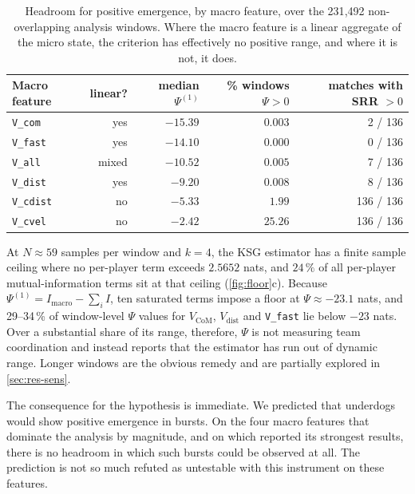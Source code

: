 \documentclass[11pt,a4paper]{article}
\newcommand{\code}[1]{\texttt{\small #1}}
\newcommand{\Vcom}{V_{\mathrm{CoM}}}
\newcommand{\Vdist}{V_{\mathrm{dist}}}
\begin{document}
\begin{table}[H]
\centering
\small
\begin{tabular}{@{}lrrrr@{}}
\toprule
\textbf{Macro feature} & \textbf{linear?} & \textbf{median $\Psi^{(1)}$} & \textbf{\% windows $\Psi>0$} & \textbf{matches with SRR $>0$} \\
\midrule
\code{V\_com}   & yes & $-15.39$ & $0.003$  & 2 / 136 \\
\code{V\_fast}  & yes & $-14.10$ & $0.000$  & 0 / 136 \\
\code{V\_all}   & mixed & $-10.52$ & $0.005$ & 7 / 136 \\
\code{V\_dist}  & yes & $-9.20$  & $0.008$  & 8 / 136 \\
\code{V\_cdist} & no & $-5.33$  & $1.99$ & 136 / 136 \\
\code{V\_cvel}  & no & $-2.42$  & $25.26$ & 136 / 136 \\
\bottomrule
\end{tabular}
\caption{Headroom for positive emergence, by macro feature, over the 231{,}492
non-overlapping analysis windows. Where the macro feature is a linear aggregate of the
micro state, the criterion has effectively no positive range, and where it is not, it does.}
\label{tab:headroom}
\end{table}

At $N\approx59$ samples per window and $k=4$, the KSG estimator has a finite sample ceiling where no per-player
term exceeds $2.5652$ nats, and $24\,\%$ of all per-player mutual-information terms
sit at that ceiling (\cref{fig:floor}c). Because $\Psi^{(1)}=I_{\text{macro}}-\sum_i I$,
ten saturated terms impose a floor at $\Psi\approx-23.1$ nats, and 29--34\,\% of window-level
$\Psi$ values for $\Vcom$, $\Vdist$ and \code{V\_fast} lie below $-23$ nats. Over a substantial share of its
range, therefore, $\Psi$ is not measuring team coordination and instead reports that
the estimator has run out of dynamic range. Longer windows are the obvious remedy and are
partially explored in \cref{sec:res-sens}.

The consequence for the hypothesis is immediate. We predicted that underdogs would show
positive emergence in bursts. On the four macro features that dominate the analysis
by magnitude, and on which \cite{cheng2025} reported its strongest results, there is
no headroom in which such bursts could be observed at all. 
The prediction is not so much refuted as untestable with this instrument on these features.
\end{document}
